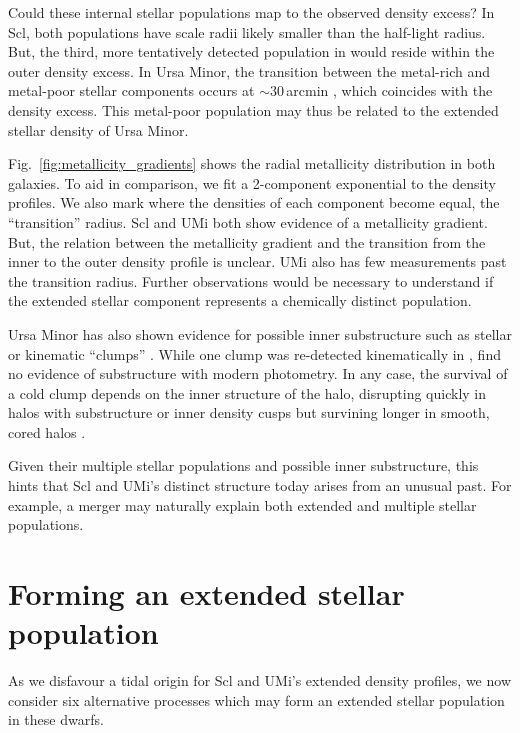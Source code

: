 Could these internal stellar populations map to the observed density
excess? In Scl, both populations have scale radii likely smaller than
the half-light radius. But, the third, more tentatively detected
population in \citet{arroyo-polonio+2024} would reside within the outer
density excess. In Ursa Minor, the transition between the metal-rich and
metal-poor stellar components occurs at \(\sim 30\,\)arcmin
\citep{pace+2020}, which coincides with the density excess. This
metal-poor population may thus be related to the extended stellar
density of Ursa Minor.

Fig.~\ref{fig:metallicity_gradients} shows the radial metallicity
distribution in both galaxies. To aid in comparison, we fit a
2-component exponential to the density profiles. We also mark where the
densities of each component become equal, the ``transition'' radius. Scl
and UMi both show evidence of a metallicity gradient. But, the relation
between the metallicity gradient and the transition from the inner to
the outer density profile is unclear. UMi also has few measurements past
the transition radius. Further observations would be necessary to
understand if the extended stellar component represents a chemically
distinct population.

Ursa Minor has also shown evidence for possible inner substructure such
as stellar or kinematic ``clumps''
\citep[e.g.,][]{olszewski+aaronson1985, demers+1995, kleyna+1998, battinelli+demers1999, bellazzini+2002}.
While one clump was re-detected kinematically in \citet{pace+2014},
\citet{munoz+2018} find no evidence of substructure with modern
photometry. In any case, the survival of a cold clump depends on the
inner structure of the halo, disrupting quickly in halos with
substructure or inner density cusps but survining longer in smooth,
cored halos \citep{kleyna+2003, lora+2012}.

Given their multiple stellar populations and possible inner
substructure, this hints that Scl and UMi's distinct structure today
arises from an unusual past. For example, a merger may naturally explain
both extended and multiple stellar populations.

\section{Forming an extended stellar
population}\label{sec:stellar_halos}

As we disfavour a tidal origin for Scl and UMi's extended density
profiles, we now consider six alternative processes which may form an
extended stellar population in these dwarfs.

